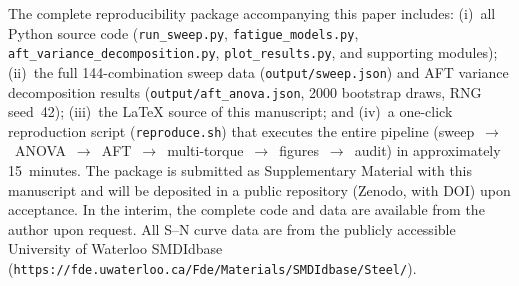 \documentclass[12pt,a4paper]{article}
\begin{document}
The complete reproducibility package accompanying this paper includes:
(i)~all Python source code (\texttt{run\_sweep.py},
\texttt{fatigue\_models.py}, \texttt{aft\_variance\_decomposition.py},
\texttt{plot\_results.py}, and supporting modules);
(ii)~the full 144-combination sweep data
(\texttt{output/sweep.json}) and AFT variance decomposition results
(\texttt{output/aft\_anova.json}, 2000 bootstrap draws, RNG seed~42);
(iii)~the LaTeX source of this manuscript; and
(iv)~a one-click reproduction script (\texttt{reproduce.sh}) that
executes the entire pipeline (sweep~$\rightarrow$~ANOVA~$\rightarrow$~AFT~$\rightarrow$~multi-torque~$\rightarrow$~figures~$\rightarrow$~audit)
in approximately 15~minutes.
The package is submitted as Supplementary Material with this
manuscript and will be deposited in a public repository (Zenodo,
with DOI) upon acceptance. In the interim, the complete code and
data are available from the author upon request. All S--N curve data are from the
publicly accessible University of Waterloo SMDIdbase
(\texttt{https://fde.uwaterloo.ca/Fde/Materials/SMDIdbase/Steel/}).
\end{document}
